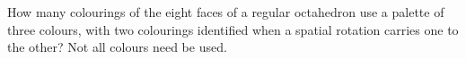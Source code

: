 How many colourings of the eight faces of a regular octahedron use a palette of three colours, with two colourings identified when a spatial rotation carries one to the other? Not all colours need be used.
